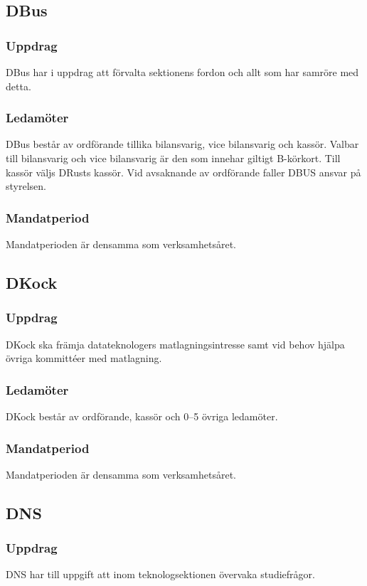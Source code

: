 \subsection{DBus}
\subsubsection{Uppdrag}
DBus har i uppdrag att förvalta sektionens fordon och allt som har samröre med detta.
\subsubsection{Ledamöter}
DBus består av ordförande tillika bilansvarig, vice bilansvarig och kassör. Valbar till bilansvarig och vice bilansvarig är den som innehar giltigt B-körkort. Till kassör väljs DRusts kassör. Vid avsaknande av ordförande faller DBUS ansvar på styrelsen.
\subsubsection{Mandatperiod}
Mandatperioden är densamma som verksamhetsåret.

\subsection{DKock}
\subsubsection{Uppdrag}
DKock ska främja datateknologers matlagningsintresse samt vid behov hjälpa övriga kommittéer med matlagning.
\subsubsection{Ledamöter}
DKock består av ordförande, kassör och 0--5 övriga ledamöter.
\subsubsection{Mandatperiod}
Mandatperioden är densamma som verksamhetsåret.

\subsection{DNS}
\subsubsection{Uppdrag}
DNS har till uppgift att inom teknologsektionen övervaka studiefrågor.
